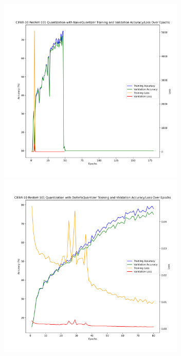\documentclass{article}
\begin{document}
\begin{figure}
    \centerline{\includegraphics[width=3.5in]{../proj2/figures/cifar10_resnet101_NaiveQuantizer.png}\includegraphics[width=3.5in]{../proj2/figures/cifar10_resnet101_DoReFaQuantizer.png}}

\end{figure}
\end{document}
